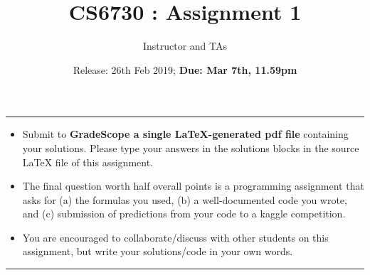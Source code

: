 \documentclass[addpoints,11pt,a4paper]{exam}
\title{CS6730 : Assignment 1}
\author{Instructor and TAs}
\date{Release: 26th Feb 2019; {\bf Due: Mar 7th, 11.59pm}}
\begin{document}
\maketitle
\noindent\rule{\textwidth}{1pt}
\begin{itemize}
    \item Submit to {\bf GradeScope a single LaTeX-generated pdf file} containing your solutions. Please type your answers in the solutions blocks in the source LaTeX file of this assignment. 
    \item The final question worth half overall points is a programming assignment that asks for (a) the formulas you used, (b) a well-documented code you wrote, and (c) submission of predictions from your code to a kaggle competition. 
    \item You are encouraged to collaborate/discuss with other students on this assignment, but write your solutions/code in your own words.
\end{itemize}
\noindent\rule{\textwidth}{1pt}
\end{document}
